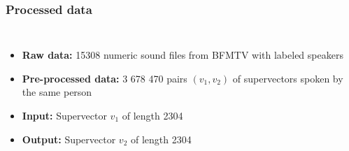 \documentclass[11pt,english]{beamer}
\begin{document}
\begin{frame}
  \frametitle{Processed data}

  \begin{columns}
    \begin{itemize}
\setlength\itemsep{2em}
    \item \textbf{Raw data:} 15308 numeric sound files from BFMTV with labeled speakers
    \item \textbf{Pre-processed data:} 3 678 470 pairs $(v_1,v_2)$ of supervectors
      spoken by the same person
    \item \textbf{Input:} Supervector $v_1$ of length 2304
    \item \textbf{Output:} Supervector $v_2$ of length 2304

    \end{itemize}

  \end{columns}

\end{frame}
\end{document}

